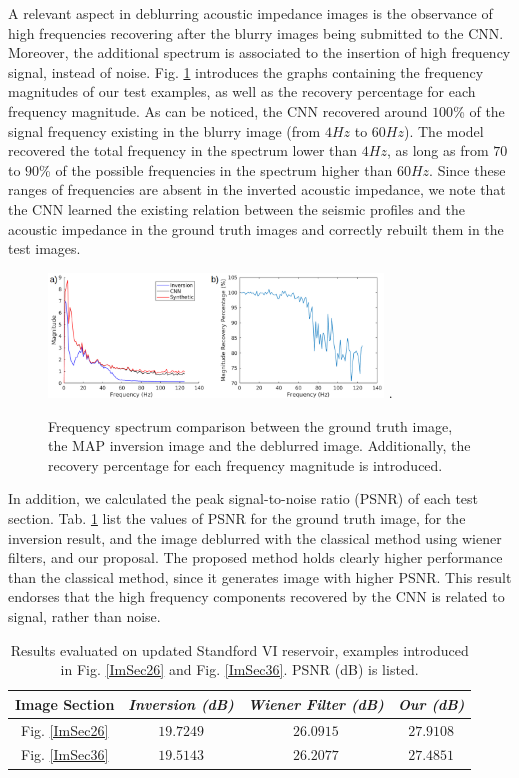 \documentclass[journal]{IEEEtran}
\begin{document}
A relevant aspect in deblurring acoustic impedance images
is the observance of high frequencies recovering after the
blurry images being submitted to the CNN. Moreover, the
additional spectrum is associated to the insertion
of high frequency signal, instead of noise.
Fig. \ref{frequencies} introduces the graphs containing the frequency
magnitudes of our test examples, as well as the recovery percentage
for each frequency magnitude. As can be noticed,
the CNN recovered around $100$\% of the signal frequency existing
in the blurry image (from $4Hz$ to $60Hz$). The model recovered
the total frequency in the spectrum lower than
$4Hz$, as long as from $70$ to $90$\% of the possible frequencies
in the spectrum higher than $60Hz$.
Since these ranges of frequencies are absent in the inverted acoustic
impedance, we note that the CNN learned the existing relation between the
seismic profiles and the acoustic impedance in the ground truth images
and correctly rebuilt them in the test images.
\begin{figure}[!t]
\centering
\includegraphics[width=3.5in]{Figs/frequencies}
\DeclareGraphicsExtensions.
\caption{Frequency spectrum comparison between the ground truth image,
the MAP inversion image and the deblurred image. Additionally, the recovery percentage
for each frequency magnitude is introduced.}
\label{frequencies}
\end{figure}

In addition, we calculated the peak signal-to-noise ratio (PSNR) of each
test section. Tab. \ref{table_results} list the values of PSNR for the
ground truth image, for the inversion result, and
the image deblurred with the classical method using wiener
filters, and our proposal. The proposed method holds clearly
higher performance than the classical method, since it generates
image with higher PSNR. This result endorses that the high frequency
components recovered by the CNN is related to signal, rather than noise.
\begin{table}[!t]
\renewcommand{\arraystretch}{1.3}
\caption{Results evaluated on updated Standford VI reservoir, examples
introduced in Fig. \ref{ImSec26} and Fig. \ref{ImSec36}. PSNR (dB) is listed.}
\label{table_results}
\centering
\begin{tabular}{|c||c||c||c|}
\hline
 \textbf{Image Section} & \textbf{\textit{Inversion (dB)}} & \textbf{\textit{Wiener Filter (dB)}} & \textbf{\textit{Our (dB)}} \\
\hline
Fig. \ref{ImSec26} & $19.7249$ & $26.0915$ & $27.9108$ \\
\hline
Fig. \ref{ImSec36} & $19.5143$ & $26.2077$ & $27.4851$ \\
\hline
\end{tabular}
\end{table}
\end{document}
